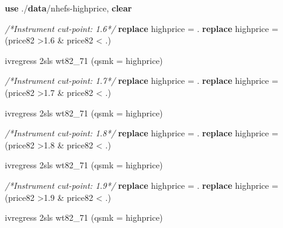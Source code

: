 \documentclass[
  10pt,
]{book}
\newenvironment{Shaded}{\begin{snugshade}}{\end{snugshade}}
\newcommand{\CommentTok}[1]{\textcolor[rgb]{0.56,0.35,0.01}{\textit{#1}}}
\newcommand{\KeywordTok}[1]{\textcolor[rgb]{0.13,0.29,0.53}{\textbf{#1}}}
\newcommand{\NormalTok}[1]{#1}
\begin{document}
\begin{Shaded}
\begin{Highlighting}[]
\KeywordTok{use}\NormalTok{ ./}\KeywordTok{data}\NormalTok{/nhefs{-}highprice, }\KeywordTok{clear}

\CommentTok{/*Instrument cut{-}point: 1.6*/}
\KeywordTok{replace}\NormalTok{ highprice = .}
\KeywordTok{replace}\NormalTok{ highprice = (price82 \textgreater{}1.6 \& price82 \textless{} .)}

\NormalTok{ivregress 2sls wt82\_71 (qsmk = highprice)}

\CommentTok{/*Instrument cut{-}point: 1.7*/}
\KeywordTok{replace}\NormalTok{ highprice = .}
\KeywordTok{replace}\NormalTok{ highprice = (price82 \textgreater{}1.7 \& price82 \textless{} .)}

\NormalTok{ivregress 2sls wt82\_71 (qsmk = highprice)}

\CommentTok{/*Instrument cut{-}point: 1.8*/}
\KeywordTok{replace}\NormalTok{ highprice = .}
\KeywordTok{replace}\NormalTok{ highprice = (price82 \textgreater{}1.8 \& price82 \textless{} .)}

\NormalTok{ivregress 2sls wt82\_71 (qsmk = highprice)}

\CommentTok{/*Instrument cut{-}point: 1.9*/}
\KeywordTok{replace}\NormalTok{ highprice = .}
\KeywordTok{replace}\NormalTok{ highprice = (price82 \textgreater{}1.9 \& price82 \textless{} .)}

\NormalTok{ivregress 2sls wt82\_71 (qsmk = highprice)}
\end{Highlighting}
\end{Shaded}
\end{document}
